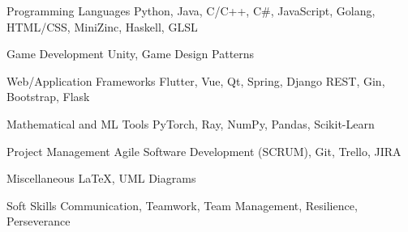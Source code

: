 

\begin{cvskills}

  \cvskill
    {Programming Languages} %
    {Python, Java, C/C++, C\#, JavaScript, Golang, HTML/CSS, MiniZinc, Haskell, GLSL} %

  \cvskill
    {Game Development} %
    {Unity, Game Design Patterns} %

  \ifbool{FullVersion}{
    \cvskill
        {GPU Programming Frameworks} %
        {CUDA and OpenACC} %
    
    \cvskill
        {Graphics Libraries} %
        {OpenGL, GLUT, GLFW, GLEW, SDL} %
  }{    
   \cvskill
    {Graphics and GPU Libraries} %
    {OpenGL, GLUT, GLFW, SDL, CUDA} %
  }


        

  \cvskill
    {Web/Application Frameworks} %
    {Flutter, Vue, Qt, Spring, Django REST, Gin, Bootstrap, Flask} %


  \cvskill
    {Mathematical and ML Tools} %
    {PyTorch, Ray, NumPy, Pandas, Scikit-Learn} %

  \cvskill
    {Project Management} %
    {Agile Software Development (SCRUM), Git, Trello, JIRA} %

  \cvskill
    {Miscellaneous} %
    {\LaTeX \space, UML Diagrams} %

  \cvskill
    {Soft Skills} %
    {Communication, Teamwork, Team Management, Resilience, Perseverance} %

\end{cvskills}
